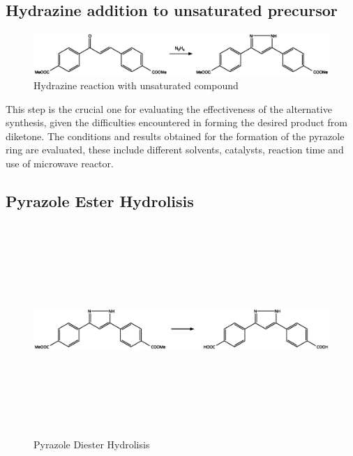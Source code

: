 \documentclass[../Master.tex]{subfiles}
\begin{document}
\subsection{Hydrazine addition to unsaturated precursor}\label{sec:hyd-add-ins}

\begin{figure}[h!]
	\centering
	\includegraphics[width=13cm,keepaspectratio]{Structures/pyrazole-form-alternative.eps}
	\caption{Hydrazine reaction with unsaturated compound}
\end{figure}


This step is the crucial one for evaluating the effectiveness of the alternative synthesis, given the difficulties encountered in forming the desired product from diketone. The conditions and results obtained for the formation of the pyrazole ring are evaluated, these include different solvents, catalysts, reaction time and use of microwave reactor.

\subsection{Pyrazole Ester Hydrolisis}\label{sec:pyrazole-hydro}

\begin{figure}[h!]
	\centering
	\includegraphics[width=13cm,height=8cm,keepaspectratio]{Structures/pyrazole-hydro.eps}
	\caption{Pyrazole Diester Hydrolisis}\label{fig:pyrazole-form}
\end{figure}
\end{document}

